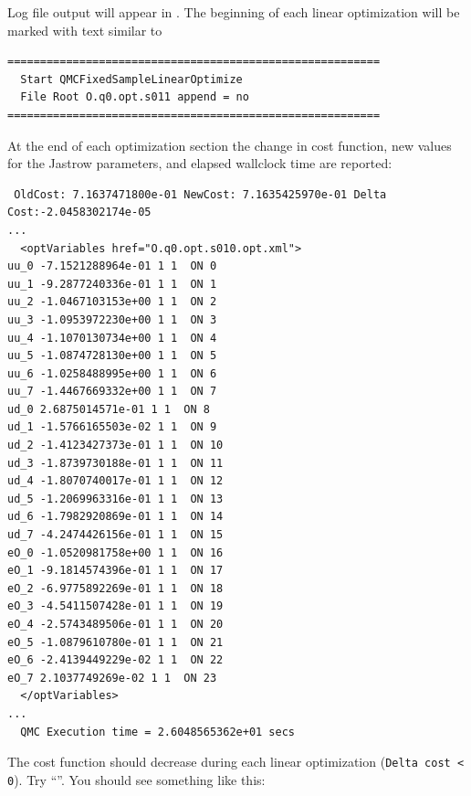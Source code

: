 Log file output will appear in .  The beginning of each linear optimization will be marked with text similar to
\begin{shaded}
\begin{verbatim}
=========================================================
  Start QMCFixedSampleLinearOptimize
  File Root O.q0.opt.s011 append = no 
=========================================================
\end{verbatim}
\end{shaded}
\noindent
At the end of each optimization section the change in cost function, new values for the Jastrow parameters, and elapsed wallclock time are reported:
\begin{shaded}
\begin{verbatim}
 OldCost: 7.1637471800e-01 NewCost: 7.1635425970e-01 Delta Cost:-2.0458302174e-05
...
  <optVariables href="O.q0.opt.s010.opt.xml">
uu_0 -7.1521288964e-01 1 1  ON 0
uu_1 -9.2877240336e-01 1 1  ON 1
uu_2 -1.0467103153e+00 1 1  ON 2
uu_3 -1.0953972230e+00 1 1  ON 3
uu_4 -1.1070130734e+00 1 1  ON 4
uu_5 -1.0874728130e+00 1 1  ON 5
uu_6 -1.0258488995e+00 1 1  ON 6
uu_7 -1.4467669332e+00 1 1  ON 7
ud_0 2.6875014571e-01 1 1  ON 8
ud_1 -1.5766165503e-02 1 1  ON 9
ud_2 -1.4123427373e-01 1 1  ON 10
ud_3 -1.8739730188e-01 1 1  ON 11
ud_4 -1.8070740017e-01 1 1  ON 12
ud_5 -1.2069963316e-01 1 1  ON 13
ud_6 -1.7982920869e-01 1 1  ON 14
ud_7 -4.2474426156e-01 1 1  ON 15
eO_0 -1.0520981758e+00 1 1  ON 16
eO_1 -9.1814574396e-01 1 1  ON 17
eO_2 -6.9775892269e-01 1 1  ON 18
eO_3 -4.5411507428e-01 1 1  ON 19
eO_4 -2.5743489506e-01 1 1  ON 20
eO_5 -1.0879610780e-01 1 1  ON 21
eO_6 -2.4139449229e-02 1 1  ON 22
eO_7 2.1037749269e-02 1 1  ON 23
  </optVariables>
...
  QMC Execution time = 2.6048565362e+01 secs
\end{verbatim}
\end{shaded}
\noindent
The cost function should decrease during each linear optimization (\texttt{Delta cost < 0}).  Try ``''.  You should see something like this:

